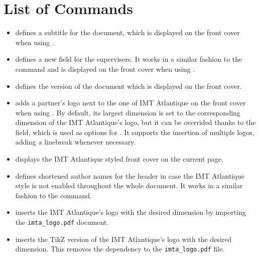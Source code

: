 \documentclass{report}
\begin{document}
\section{List of Commands}
\begin{itemize}
    \item {} defines a subtitle for the document, which is displayed on the front cover when using .
    
    \item {} defines a new field for the supervisers. 
    It works in a similar fashion to the  command and is displayed on the front cover when using .
    
    \item {} defines the version of the document which is displayed on the front cover.
    
    \item {} adds a partner's logo next to the one of IMT Atlantique on the front cover when using . 
    By default, its largest dimension is set to the corresponding dimension of the IMT Atlantique's logo, but it can be overrided thanks to the  field, which is used as options for . 
    It supports the insertion of multiple logos, adding a linebreak whenever necessary.
    
    \item {} displays the IMT Atlantique styled front cover on the current page.
    
    \item {} defines shortened author names for the header in case the IMT Atlantique style is not enabled throughout the whole document.
    It works in a similar fashion to the  command.
    
    \item {} inserts the IMT Atlantique's logo with the desired dimension by importing the \texttt{imta\_logo.pdf} document.
    
    \item {} inserts the TikZ version of the IMT Atlantique's logo with the desired dimension. 
    This removes the dependency to the \texttt{imta\_logo.pdf} file.
    

\end{itemize}
\end{document}
